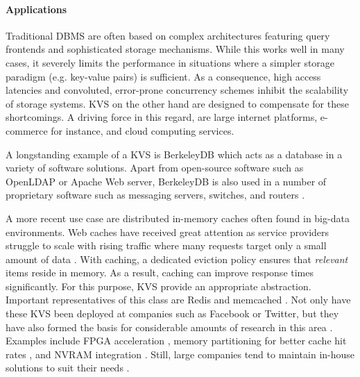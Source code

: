 \paragraph{Applications}

Traditional \ac{DBMS} are often based on complex architectures featuring query
frontends and sophisticated storage mechanisms. While this works well in many
cases, it severely limits the performance in situations where a simpler storage
paradigm (e.g. key-value pairs) is sufficient. As a consequence, high access
latencies and convoluted, error-prone concurrency schemes inhibit the
scalability of storage systems. \ac{KVS} on the other hand are designed to
compensate for these shortcomings. A driving force in this regard, are large
internet platforms, e-commerce for instance, and cloud computing services.

A longstanding example of a \ac{KVS} is BerkeleyDB which acts as a database in a
variety of software solutions. Apart from open-source software such as OpenLDAP
or Apache Web server, BerkeleyDB is also used in a number of proprietary
software such as messaging servers, switches, and routers
\cite{kaestner2007aspect, olson1999berkeley}.

A more recent use case are distributed in-memory caches often found in big-data
environments. Web caches have received great attention as service providers
struggle to scale with rising traffic where many requests target only a small
amount of data \cite{xu2014characterizing}. With caching, a dedicated eviction
policy ensures that \emph{relevant} items reside in memory. As a result, caching
can improve response times significantly. For this purpose, \ac{KVS} provide an
appropriate abstraction. Important representatives of this class are Redis and
memcached \cite{redis2017home, memcached2017home}. Not only have these \ac{KVS}
been deployed at companies such as Facebook or Twitter, but they have also
formed the basis for considerable amounts of research in this area
\cite{xu2014characterizing}. Examples include \ac{FPGA} acceleration
\cite{lavasani2014fpga}, memory partitioning for better cache hit rates
\cite{carra2014memory}, and \ac{NVRAM} integration \cite{wu2016nvmcached,
malinowski2017using, venkataraman2011consistent}. Still, large companies tend to
maintain in-house solutions to suit their needs \cite{chang2008bigtable,
decandia2007dynamo, lakshman2010cassandra, wang2015hydradb}.

